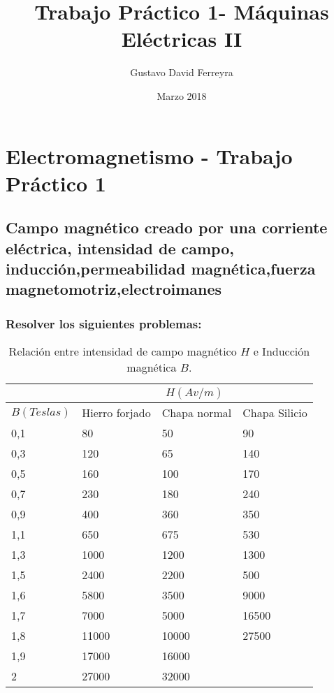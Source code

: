 \documentclass[a4paper]{article}
\title{Trabajo Práctico 1- Máquinas Eléctricas II}
\author{Gustavo David Ferreyra }
\date{Marzo 2018}
\begin{document}
\fancyhead[C]{}
\fancyfoot[C]{}
\fancyfoot[R]{}
\pagestyle{fancy} 
\section{Electromagnetismo - Trabajo Práctico 1}
\subsection{Campo magnético creado por una corriente eléctrica, intensidad de campo, inducción,permeabilidad magnética,fuerza magnetomotriz,electroimanes}
\subsubsection{Resolver los siguientes problemas:}

\begin{table}
\caption{Relación entre intensidad de campo magnético $H$ e Inducción magnética $B$.\label{long}}
\begin{center}
\begin{tabular}[c]{|p{2cm}|p{3cm}|p{3cm}|p{3cm}|}

 \hline
  & \multicolumn{3}{|c|}{$H(Av/m)$} \\
 \hline
 {$B(Teslas)$} & Hierro forjado & Chapa normal & Chapa Silicio \\
 \hline
 0,1 & 80 & 50 & 90 \\
 0,3 & 120 & 65&140 \\
 0,5&160&100&170\\
 0,7&230&180&240\\
 0,9&400&360&350\\
 1,1&650&675&530\\
 1,3&1000&1200&1300\\
 1,5&2400&2200&500\\
 1,6&5800&3500&9000\\
 1,7&7000&5000&16500\\
 1,8&11000&10000&27500\\
 1,9&17000&16000&\\
 2&27000&32000&\\
 \hline
\end{tabular}
\end{center}
\end{table}
\end{document}
